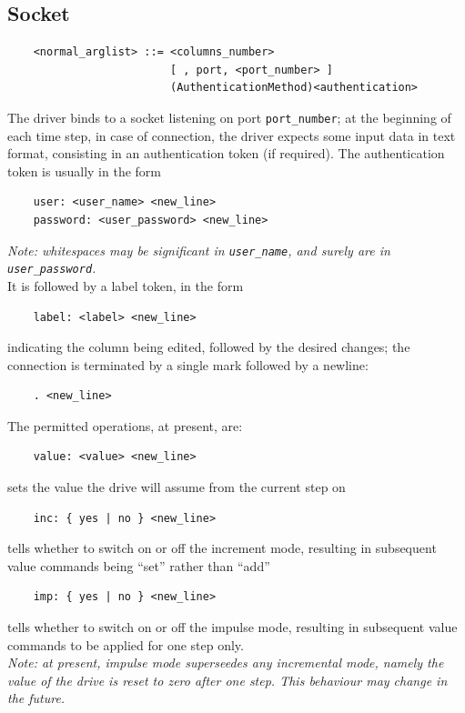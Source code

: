 \documentclass[10pt,dvips]{report}
\begin{document}
\subsection{Socket}
\begin{verbatim}
    <normal_arglist> ::= <columns_number>
                         [ , port, <port_number> ]
                         (AuthenticationMethod)<authentication>
\end{verbatim}
The driver binds to a socket listening on port {\tt port\_number}; at the
beginning of each time step, in case of connection, the driver expects some
input data in text format, consisting in an authentication token 
(if required).
The authentication token is usually in the form
\begin{verbatim}
    user: <user_name> <new_line>
    password: <user_password> <new_line>
\end{verbatim}
{\em 
    Note: whitespaces may be significant in {\tt user\_name}, and surely are
    in {\tt user\_password}.
} \\    
It is followed by a label token, in the form
\begin{verbatim}
    label: <label> <new_line>
\end{verbatim}
indicating the column being edited, followed by the desired changes; 
the connection is terminated by a single mark followed by a newline:
\begin{verbatim}
    . <new_line>
\end{verbatim}
The permitted operations, at present, are:
\begin{verbatim}
    value: <value> <new_line>
\end{verbatim}
sets the value the drive will assume from the current step on
\begin{verbatim}
    inc: { yes | no } <new_line>
\end{verbatim}
tells whether to switch on or off the increment mode, resulting in
subsequent value commands being ``set'' rather than ``add''
\begin{verbatim}
    imp: { yes | no } <new_line>
\end{verbatim}
tells whether to switch on or off the impulse mode, resulting in subsequent
value commands to be applied for one step only. \\
{\em 
    Note: at present, impulse mode superseedes any incremental mode, namely
    the value of the drive is reset to zero after one step.
    This behaviour may change in the future.
}
\end{document}
